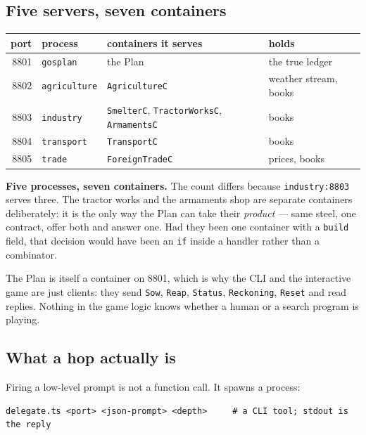 \documentclass[11pt,a4paper]{article}
\begin{document}
\subsection{Five servers, seven containers}

\begin{center}
\footnotesize
\begin{tabular}{@{}rlll@{}}
\toprule
port & process & containers it serves & holds \\
\midrule
8801 & \texttt{gosplan}     & the Plan & the true ledger \\
8802 & \texttt{agriculture} & \texttt{AgricultureC} & weather stream, books \\
8803 & \texttt{industry}    & \texttt{SmelterC}, \texttt{TractorWorksC}, \texttt{ArmamentsC} & books \\
8804 & \texttt{transport}   & \texttt{TransportC} & books \\
8805 & \texttt{trade}       & \texttt{ForeignTradeC} & prices, books \\
\bottomrule
\end{tabular}
\end{center}

\noindent \textbf{Five processes, seven containers.} The count differs because
\texttt{industry:8803} serves three. The tractor works and the armaments shop
are separate containers deliberately: it is the only way the Plan can take their
\emph{product} --- same steel, one contract, offer both and answer one. Had they
been one container with a \texttt{build} field, that decision would have been an
\texttt{if} inside a handler rather than a combinator.

The Plan is itself a container on 8801, which is why the CLI and the
interactive game are just clients: they send \texttt{Sow}, \texttt{Reap},
\texttt{Status}, \texttt{Reckoning}, \texttt{Reset} and read replies. Nothing
in the game logic knows whether a human or a search program is playing.

\subsection{What a hop actually is}

Firing a low-level prompt is not a function call. It spawns a process:

\begin{lstlisting}
delegate.ts <port> <json-prompt> <depth>     # a CLI tool; stdout is the reply
\end{lstlisting}
\end{document}
